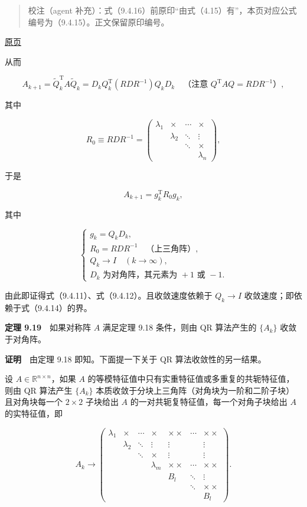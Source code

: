 \documentclass[
  10pt,
  fontset=fandol]{ctexart}
\begin{document}
\begin{quote}
校注（agent 补充）：式（9.4.16）前原印``由式（4.15）有''，本页对应公式编号为（9.4.15）。正文保留原印编号。
\end{quote}

\href{../../source-images/pdf-255.jpeg}{原页}

从而

\[
A_{k+1}=\widetilde Q_k^{\mathrm T}A\widetilde Q_k
=D_kQ_k^{\mathrm T}(RDR^{-1})Q_kD_k
\quad\text{（注意 }Q^{\mathrm T}AQ=RDR^{-1}\text{）},
\]

其中

\[
R_0\equiv RDR^{-1}=\begin{pmatrix}
\lambda_1&\times&\cdots&\times\\
&\lambda_2&\ddots&\vdots\\
&&\ddots&\times\\
&&&\lambda_n
\end{pmatrix},
\]

于是

\[
A_{k+1}=g_k^{\mathrm T}R_0g_k,
\]

其中

\[
\begin{cases}
g_k=Q_kD_k,\\
R_0=RDR^{-1}\quad\text{（上三角阵）},\\
Q_k\to I\quad(k\to\infty),\\
D_k\text{ 为对角阵，其元素为 }+1\text{ 或 }-1.
\end{cases}
\]

由此即证得式（9.4.11）、式（9.4.12）。且收敛速度依赖于 \(Q_k\to I\) 收敛速度；即依赖于式（9.4.14）的界。

\textbf{定理 9.19}　如果对称阵 \(A\) 满足定理 9.18 条件，则由 QR 算法产生的 \(\{A_k\}\) 收敛于对角阵。

\textbf{证明}　由定理 9.18 即知。下面提一下关于 QR 算法收敛性的另一结果。

设 \(A\in\mathbb R^{n\times n}\)，如果 \(A\) 的等模特征值中只有实重特征值或多重复的共轭特征值，则由 QR 算法产生 \(\{A_k\}\) 本质收敛于分块上三角阵（对角块为一阶和二阶子块）且对角块每一个 \(2\times2\) 子块给出 \(A\) 的一对共轭复特征值，每一个对角子块给出 \(A\) 的实特征值，即

\[
A_k\to\begin{pmatrix}
\lambda_1&\times&\cdots&\times&\times\times&\cdots&\times\times\\
&\lambda_2&\ddots&\vdots&\vdots&&\vdots\\
&&\ddots&\times&\vdots&&\vdots\\
&&&\lambda_m&\times\times&\cdots&\times\times\\
&&&&B_l&\ddots&\vdots\\
&&&&&\ddots&\times\times\\
&&&&&&B_l
\end{pmatrix}.
\]
\end{document}
